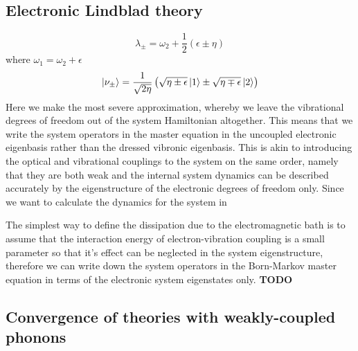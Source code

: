 \documentclass[]{article}
\begin{document}
\subsection{Electronic Lindblad theory}
\label{ssec:electronic}
\begin{equation}
\lambda_{\pm} = \omega_2 + \frac{1}{2}(\epsilon \pm \eta)
\end{equation}
where $\omega_1 = \omega_2 +\epsilon$
\begin{equation}
\ket{\nu_\pm} = \frac{1}{\sqrt{2\eta}}\left(\sqrt{\eta\pm\epsilon}\ket{1}\pm\sqrt{\eta\mp\epsilon}\ket{2}\right)
\end{equation}
Here we make the most severe approximation, whereby we leave the vibrational degrees of freedom out of the system Hamiltonian altogether. This means that we write the system operators in the master equation in the uncoupled electronic eigenbasis rather than the dressed vibronic eigenbasis. This is akin to introducing the optical and vibrational couplings to the system on the same order, namely that they are both weak and the internal system dynamics can be described accurately by the eigenstructure of the electronic degrees of freedom only. Since we want to calculate the dynamics for the system in

The simplest way to define the dissipation due to the electromagnetic bath is to assume that the interaction energy of electron-vibration coupling is a small parameter so that it's effect can be neglected in the system eigenstructure, therefore we can write down the system operators in the Born-Markov master equation in terms of the electronic system eigenstates only.
\textbf{TODO}
\subsection{Convergence of theories with weakly-coupled phonons}
\end{document}
